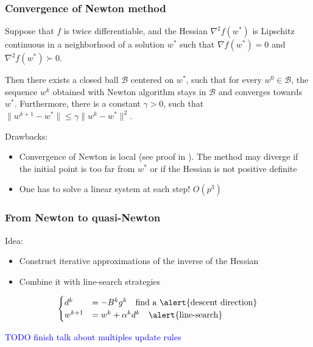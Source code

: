 \begin{frame}[t]\frametitle{Convergence of Newton method}
    \begin{Theorem}
    Suppose that $f$ is twice differentiable, and the Hessian $\nabla^2 f(w^*)$ is Lipschitz continuous in a neighborhood of a solution $w^*$
    such that $\nabla f(w^*) = 0$ and $\nabla^2 f(w^*) \succ 0$.
    
    Then there exists a closed ball $\mathcal{B}$ centered on $w^*$,
    such that for every $w^0 \in \mathcal{B}$, the sequence $w^k$ obtained
    with Newton algorithm stays in $\mathcal{B}$ and converges towards $w^*$.
    Furthermore, there is a constant $\gamma > 0$, such that
    $\|w^{k+1} - w^* \| \leq \gamma \|w^{k} - w^* \|^2$.
    \end{Theorem}
    \pause
    Drawbacks:
    \begin{itemize}
        \item \alert{Convergence} of Newton is \alert{local} (see proof in ).
        The method \alert{may diverge} if the initial point is too far
        from $w^*$ or if the Hessian is \alert{not positive definite}
        \item One has to solve a linear system at each step! $O(p^3)$
    \end{itemize}
\end{frame}

\begin{frame}[t]\frametitle{From Newton to quasi-Newton}
    
    Idea:
    \begin{itemize}
        \item Construct iterative approximations of the inverse of the Hessian 
        \item Combine it with line-search strategies
    \end{itemize}
    
    \pause
    \vspace{1em} 

    \begin{equation*}
        \begin{cases}
            d^k 
            &= -B^k g^k 
            \quad \text{find a \alert{descent direction}}
            \\
            w^{k+1} 
            &= w^k + \alpha^k d^k
             \quad \text{\alert{line-search}}
        \end{cases}
    \end{equation*}
    
    \vspace{2em}
    
    \textcolor{blue}{TODO finish talk about multiples update rules}
    
\end{frame}

